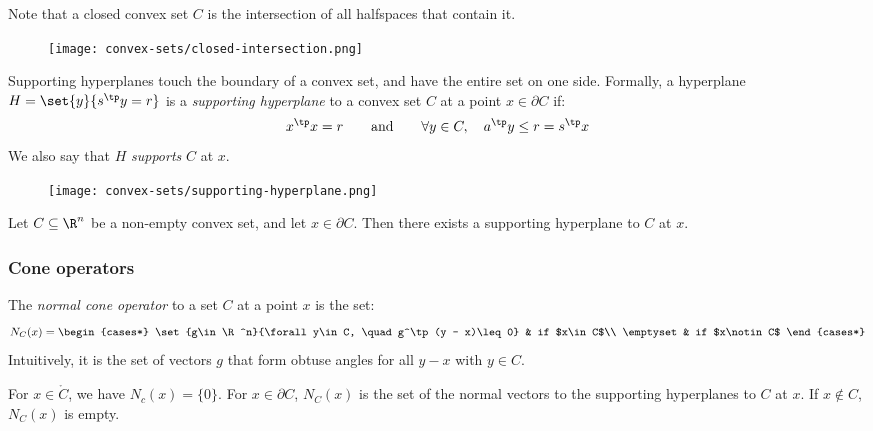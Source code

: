 Note that a closed convex set $C$ is the intersection of all halfspaces that contain it.
\begin{figure}[H]
    \centering
    \texttt{[image: convex-sets/closed-intersection.png]}
\end{figure}

\begin{definition}
    Supporting hyperplanes touch the boundary of a convex set, and have the entire set on one side. Formally, a hyperplane $H = \set{y}{s^\tp y=r}$ is a \emph{supporting hyperplane} to a convex set $C$ at a point $x\in\partial C$ if:
    \begin{equation*}
        x^\tp x = r \qquad \text{and} \qquad \forall y\in C, \quad a^\tp y\leq r = s^\tp x
    \end{equation*}
    We also say that $H$ \emph{supports} $C$ at $x$.
    \begin{figure}[H]
        \centering
        \texttt{[image: convex-sets/supporting-hyperplane.png]}
    \end{figure}
\end{definition}

\begin{property}
    Let $C\subseteq\R^n$ be a non-empty convex set, and let $x\in\partial C$. Then there exists a supporting hyperplane to $C$ at $x$.
\end{property}

\subsubsection{Cone operators}
\begin{definition}
    The \emph{normal cone operator} to a set $C$ at a point $x$ is the set:
    \begin{equation*}
        N_C(x) = \begin{cases*}
            \set{g\in\R^n}{\forall y\in C, \quad g^\tp(y - x)\leq 0} & if $x\in C$\\
            \emptyset & if $x\notin C$
        \end{cases*}
    \end{equation*}
    Intuitively, it is the set of vectors $g$ that form obtuse angles for all $y-x$ with $y\in C$.
\end{definition}

For $x\in \mathring{C}$, we have $N_c(x)=\{0\}$. For $x\in\partial C$, $N_C(x)$ is the set of the normal vectors to the supporting hyperplanes to $C$ at $x$. If $x\notin C$, $N_C(x)$ is empty.

